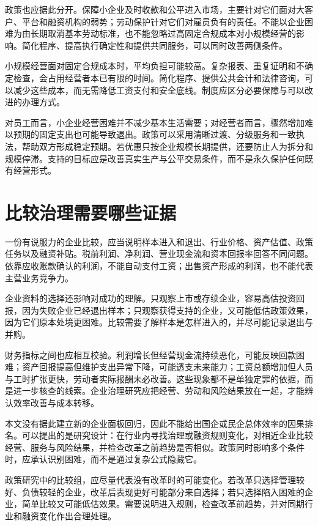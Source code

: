 \documentclass[UTF8,fontset=fandol,zihao=-4,oneside,openany]{ctexbook}
\begin{document}
政策也应据此分开。保障小企业及时收款和公平进入市场，主要针对它们面对大客户、平台和融资机构的弱势；劳动保护针对它们对雇员负有的责任。不能以企业困难为由长期取消基本劳动标准，也不能忽略过高固定合规成本对小规模经营的影响。简化程序、提高执行确定性和提供共同服务，可以同时改善两侧条件。

\label{arg:P092}
小规模经营面对固定合规成本时，平均负担可能较高。复杂报表、重复证明和不确定检查，会占用经营者本已有限的时间。简化程序、提供公共会计和法律咨询，可以减少这些成本，而无需降低工资支付和安全底线。制度应区分必要保障与可以改进的办理方式。

对员工而言，小企业经营困难并不减少基本生活需要；对经营者而言，骤然增加难以预期的固定支出也可能导致退出。政策可以采用清晰过渡、分级服务和一致执法，帮助双方形成稳定预期。若优惠只按企业规模长期提供，还要防止人为拆分和规模停滞。支持的目标应是改善真实生产与公平交易条件，而不是永久保护任何既有经营形式。

\section{比较治理需要哪些证据}
一份有说服力的企业比较，应当说明样本进入和退出、行业价格、资产估值、政策任务以及融资补贴。税前利润、净利润、营业现金流和资本回报率回答不同问题。依靠应收账款确认的利润，不能自动支付工资；出售资产形成的利润，也不能代表主营业务竞争力。

\label{arg:P093}
企业资料的选择还影响对成功的理解。只观察上市或存续企业，容易高估投资回报，因为失败企业已经退出样本；只观察获得支持的企业，又可能低估政策效果，因为它们原本处境更困难。比较需要了解样本是怎样进入的，并尽可能记录退出与并购。

财务指标之间也应相互校验。利润增长但经营现金流持续恶化，可能反映回款困难；资产回报提高但维护支出异常下降，可能透支未来能力；工资总额增加但人员与工时扩张更快，劳动者实际报酬未必改善。这些现象都不是单独定罪的依据，而是进一步核查的线索。企业治理研究应把经营、劳动和风险结果放在一起，才能辨认效率改善与成本转移。

本文没有据此建立新的企业面板回归，因此不能给出国企或民企总体效率的因果排名。可以提出的是研究设计：在行业内寻找治理或融资规则变化，对相近企业比较经营、服务与风险结果，并检查改革之前趋势是否相似。政策同时影响多个条件时，应承认识别困难，而不是通过复杂公式隐藏它。

\label{arg:P094}
政策研究中的比较组，应尽量代表没有改革时的可能变化。若改革只选择管理较好、负债较轻的企业，改革后表现更好可能部分来自选择；若只选择陷入困难的企业，简单比较又可能低估效果。需要说明进入规则，检查改革前趋势，并对同期行业和融资变化作出合理处理。
\end{document}
